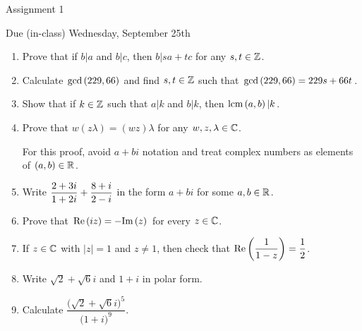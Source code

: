 \documentclass[11pt,fleqn,dvipsnames,usenames]{article}
\renewcommand{\headrulewidth}{1pt}
\begin{document}
\fancyhead[L]{\course}
\fancyhead[R]{\term}
\renewcommand{\headrulewidth}{0.4pt}

\begin{center}
{\huge Assignment 1}
\vsp

{\large Due (in-class) Wednesday, September 25th}
\end{center}

\begin{enumerate}
\item Prove that if $b|a$ and $b|c$, then $b|sa+tc$ for any $s,t\in\mathbb{Z}$.
\item Calculate $\text{gcd}\left(229,66\right)$ and find $s,t\in\mathbb{Z}$ such that $\text{gcd}\left(229,66\right) = 229s + 66t$.
\item Show that if $k\in\mathbb{Z}$ such that $a|k$ and $b|k$, then $\text{lcm}\left(a, b\right)|k$.
\item Prove that $w(z\lambda) = (wz)\lambda$ for any $w,z,\lambda\in\mathbb{C}$.

\note For this proof, avoid $a+bi$ notation and treat complex numbers as elements of $(a,b)\in\mathbb{R}$.

\item Write $\displaystyle{\frac{2 + 3i}{1 + 2i} + \frac{8+i}{2-i}}$ in the form $a+bi$ for some $a,b\in\mathbb{R}$.
\item Prove that $\text{Re}\left(iz\right) = -\text{Im}\left(z\right)$ for every $z\in\mathbb{C}$.
\item If $z\in\mathbb{C}$ with $|z| = 1$ and $z\neq 1$, then check that $\text{Re}\left(\dfrac{1}{1-z}\right) = \dfrac{1}{2}$.
\item Write $\sqrt{2} + \sqrt{6}i$ and $1+i$ in polar form.
\item Calculate $\dfrac{\big(\sqrt{2} + \sqrt{6}i\big)^5}{\big(1+i\big)^9}$.
\end{enumerate}
\vsp
\end{document}
